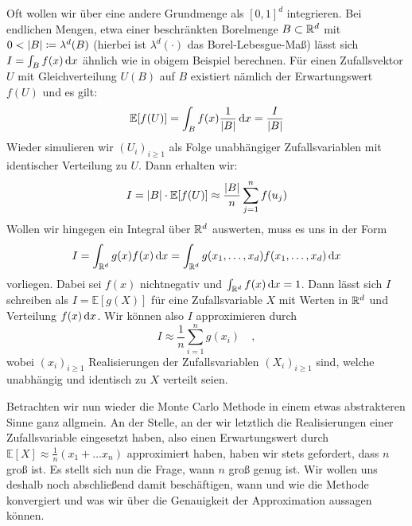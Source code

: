  	Oft wollen wir über eine andere Grundmenge als $ [0,1]^d $ integrieren. 
 	Bei endlichen Mengen, etwa einer beschränkten Borelmenge $ B \subset \mathbb{R}^d $ mit $ 0 < | B | \coloneqq \lambda^d(B) $ (hierbei ist $ \lambda^d(\cdot) $ das Borel-Lebesgue-Maß) lässt sich $ I = \int_{B} f(x) \, \mathrm{d} x $ ähnlich wie in obigem Beispiel berechnen.
	Für einen Zufallsvektor $ U $ mit Gleichverteilung $ U(B) $ auf $ B $ existiert nämlich der Erwartungswert $ f(U) $ und es gilt:
	\[
		\mathbb{E}[f(U)] = \int_{B} f(x) \frac{1}{| B |} \, \mathrm{d} x = \frac{I}{| B |}
	\]
	Wieder simulieren wir $ (U_i)_{i \geq 1} $ als Folge unabhängiger Zufallsvariablen mit identischer Verteilung zu $ U $. Dann erhalten wir:
	\[
		I = | B | \cdot \mathbb{E}[f(U)] \approx \frac{| B |}{n} \sum_{j=1}^{n}f(u_j)
	\]
	 Wollen wir hingegen ein Integral über $ \mathbb{R}^d $ auswerten, muss es uns in der Form 
	\[
	I = \int_{\mathbb{R}^d} g(x)f(x) \, \mathrm{d} x = \int_{\mathbb{R}^d} g(x_1,\dots,x_d)f(x_1,\dots,x_d) \, \mathrm{d} x
	\] 
	vorliegen. Dabei sei $ f(x) $ nichtnegativ und $ \int_{\mathbb{R}^d} f(x) \, \mathrm{d} x = 1 $.
	Dann lässt sich $ I $ schreiben als $ I = \mathbb{E}[g(X)] $ für eine Zufallsvariable $ X $ mit Werten in $ \mathbb{R}^d $ und Verteilung $ f(x) \, \mathrm{d} x $.
	Wir können also $ I $ approximieren durch
	\[
		I \approx \frac{1}{n}\sum_{i=1}^{n} g(x_i) \quad ,
	\]
	wobei $ (x_i)_{i \geq 1} $ Realisierungen der Zufallsvariablen $ (X_i)_{i \geq 1} $ sind, welche unabhängig und identisch zu $ X $ verteilt seien.
	
	Betrachten wir nun wieder die Monte Carlo Methode in einem etwas abstrakteren Sinne ganz allgmein.
	An der Stelle, an der wir letztlich die Realisierungen einer Zufallsvariable eingesetzt haben, also einen Erwartungswert durch $
	\mathbb{E}[X] \approx \frac{1}{n}(x_1 + \dots x_n)
	$ approximiert haben, haben wir stets gefordert, dass $ n $ groß ist. 
	Es stellt sich nun die Frage, wann $ n $ groß genug ist.
	Wir wollen uns deshalb noch abschließend damit beschäftigen, wann und wie die Methode konvergiert und was wir über die Genauigkeit der Approximation aussagen können.
